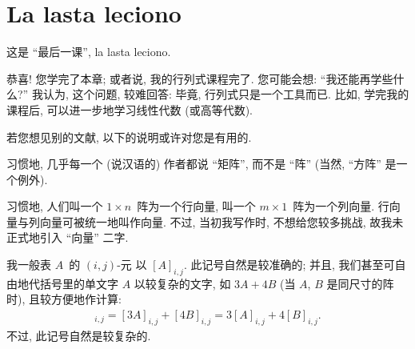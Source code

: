 \KunAsteriskoEnEnhavtabelo
\section{La lasta leciono}
\SenAsteriskoEnEnhavtabelo

\maldevigalegajxo

这是 ``最后一课'', la lasta leciono.

恭喜!
您学完了本章;
或者说, 我的行列式课程完了.
您可能会想:
``我还能再学些什么?''
我认为, 这个问题, 较难回答:
毕竟, 行列式只是一个工具而已.
比如,
学完我的课程后,
可以进一步地学习线性代数 (或高等代数).

若您想见别的文献,
以下的说明或许对您是有用的.

习惯地, 几乎每一个 (说汉语的) 作者都说 ``矩阵'',
而不是 ``阵''
(当然, ``方阵'' 是一个例外).

习惯地, 人们叫一个 \(1 \times n\)~阵为一个行向量,
叫一个 \(m \times 1\)~阵为一个列向量.
行向量与列向量可被统一地叫作向量.
不过, 当初我写作时, 不想给您较多挑战,
故我未正式地引入 ``向量'' 二字.

我一般表
\(A\)~的 \((i, j)\)-元%
以 \([A]_{i,j}\).
此记号自然是较准确的;
并且,
我们甚至可自由地代括号里的单文字 \(A\)
以较复杂的文字, 如 \(3A + 4B\)
(当 \(A\), \(B\) 是同尺寸的阵时),
且较方便地作计算:
\begin{align*}
    [3A + 4B]_{i,j}
        = [3A]_{i,j} + [4B]_{i,j}
        = 3[A]_{i,j} + 4[B]_{i,j}.
\end{align*}
不过, 此记号自然是较复杂的.

